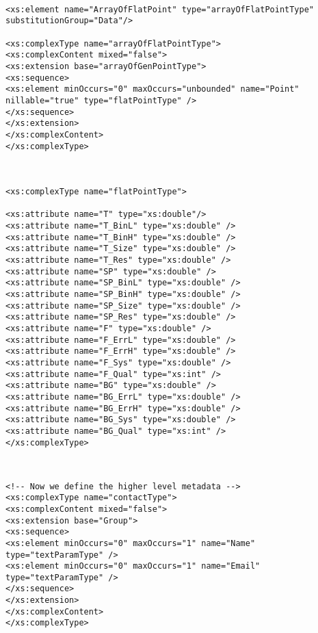 {\begin{flushleft}
\begin{fmppage}
\begin{verbatim}
\end{verbatim}
\end{fmppage}

\begin{fmppage}
\begin{verbatim}

<xs:element name="ArrayOfFlatPoint" type="arrayOfFlatPointType" substitutionGroup="Data"/>

<xs:complexType name="arrayOfFlatPointType">
<xs:complexContent mixed="false">
<xs:extension base="arrayOfGenPointType">
<xs:sequence>
<xs:element minOccurs="0" maxOccurs="unbounded" name="Point" nillable="true" type="flatPointType" />
</xs:sequence>
</xs:extension>
</xs:complexContent>
</xs:complexType>



<xs:complexType name="flatPointType">

<xs:attribute name="T" type="xs:double"/>
<xs:attribute name="T_BinL" type="xs:double" />
<xs:attribute name="T_BinH" type="xs:double" />
<xs:attribute name="T_Size" type="xs:double" />
<xs:attribute name="T_Res" type="xs:double" />
<xs:attribute name="SP" type="xs:double" />
<xs:attribute name="SP_BinL" type="xs:double" />
<xs:attribute name="SP_BinH" type="xs:double" />
<xs:attribute name="SP_Size" type="xs:double" />
<xs:attribute name="SP_Res" type="xs:double" />
<xs:attribute name="F" type="xs:double" />
<xs:attribute name="F_ErrL" type="xs:double" />
<xs:attribute name="F_ErrH" type="xs:double" />
<xs:attribute name="F_Sys" type="xs:double" />
<xs:attribute name="F_Qual" type="xs:int" />
<xs:attribute name="BG" type="xs:double" />
<xs:attribute name="BG_ErrL" type="xs:double" />
<xs:attribute name="BG_ErrH" type="xs:double" />
<xs:attribute name="BG_Sys" type="xs:double" />
<xs:attribute name="BG_Qual" type="xs:int" />
</xs:complexType>

\end{verbatim}
\end{fmppage}

\begin{fmppage}
\begin{verbatim}


<!-- Now we define the higher level metadata -->
<xs:complexType name="contactType">
<xs:complexContent mixed="false">
<xs:extension base="Group">
<xs:sequence>
<xs:element minOccurs="0" maxOccurs="1" name="Name" type="textParamType" />
<xs:element minOccurs="0" maxOccurs="1" name="Email" type="textParamType" />
</xs:sequence>
</xs:extension>
</xs:complexContent>
</xs:complexType>


\end{verbatim}
\end{fmppage}
\end{flushleft}}
